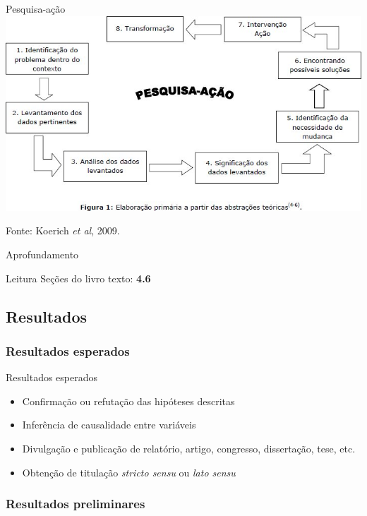 \documentclass{beamer}
\begin{document}
\begin{frame}{Pesquisa-ação}
  \includegraphics[width=\textwidth]{EstruturaI/pesquisa-acao}

  \vfill
  \scriptsize
  Fonte: Koerich {\em et al}, 2009.
\end{frame}

\begin{frame}{Aprofundamento}
  \begin{block}{Leitura}
    Seções do livro texto: {\bf 4.6}
  \end{block}
\end{frame}

\subsection{Resultados}

\subsubsection{Resultados esperados}

\begin{frame}{Resultados esperados}
  \begin{itemize}
    \footnotesize
  \item Confirmação ou refutação das hipóteses descritas
  \item Inferência de causalidade entre variáveis
  \item Divulgação e publicação de relatório, artigo, congresso,
    dissertação, tese, etc.
  \item Obtenção de titulação {\em stricto sensu} ou {\em lato sensu}
  \end{itemize}
\end{frame}

\subsubsection{Resultados preliminares}
\end{document}
